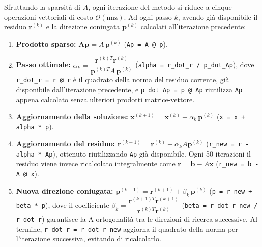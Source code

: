 \documentclass[a4paper, 12pt]{report}
\begin{document}
Sfruttando la sparsità di $A$, ogni iterazione del metodo si riduce a
cinque operazioni vettoriali di costo $\mathcal{O}(\mathrm{nnz})$.
Ad ogni passo $k$, avendo già disponibile il residuo
$\mathbf{r}^{(k)}$ e la direzione coniugata $\mathbf{p}^{(k)}$
calcolati all'iterazione precedente:
\begin{enumerate}
    \item \textbf{Prodotto sparso:} $\mathbf{Ap} = A\,\mathbf{p}^{(k)}$
          \quad(\texttt{Ap = A @ p}).

    \item \textbf{Passo ottimale:}
          $\alpha_k = \dfrac{\mathbf{r}^{(k)T}\mathbf{r}^{(k)}}
                            {\mathbf{p}^{(k)T}A\,\mathbf{p}^{(k)}}$
          \quad(\texttt{alpha = r\_dot\_r / p\_dot\_Ap}),
          dove \texttt{r\_dot\_r = r @ r} è il quadrato della norma del
          residuo corrente, già disponibile dall'iterazione precedente,
          e \texttt{p\_dot\_Ap = p @ Ap} riutilizza \texttt{Ap} appena
          calcolato senza ulteriori prodotti matrice-vettore.

    \item \textbf{Aggiornamento della soluzione:}
          $\mathbf{x}^{(k+1)} = \mathbf{x}^{(k)} + \alpha_k\,\mathbf{p}^{(k)}$
          \quad(\texttt{x = x + alpha * p}).

    \item \textbf{Aggiornamento del residuo:}
          $\mathbf{r}^{(k+1)} = \mathbf{r}^{(k)} - \alpha_k A\mathbf{p}^{(k)}$
          \quad(\texttt{r\_new = r - alpha * Ap}),
          ottenuto riutilizzando \texttt{Ap} già disponibile. Ogni 50
          iterazioni il residuo viene invece ricalcolato integralmente
          come $\mathbf{r} = \mathbf{b} - A\mathbf{x}$
          \quad(\texttt{r\_new = b - A @ x}).

    \item \textbf{Nuova direzione coniugata:}
          $\mathbf{p}^{(k+1)} = \mathbf{r}^{(k+1)} + \beta_k\,\mathbf{p}^{(k)}$
          \quad(\texttt{p = r\_new + beta * p}),
          dove il coefficiente
          $\beta_k = \dfrac{\mathbf{r}^{(k+1)T}\mathbf{r}^{(k+1)}}
                           {\mathbf{r}^{(k)T}\mathbf{r}^{(k)}}$
          \quad(\texttt{beta = r\_dot\_r\_new / r\_dot\_r})
          garantisce la A-ortogonalità tra le direzioni di ricerca
          successive. Al termine, \texttt{r\_dot\_r = r\_dot\_r\_new}
          aggiorna il quadrato della norma per l'iterazione successiva,
          evitando di ricalcolarlo.
\end{enumerate}
\end{document}
